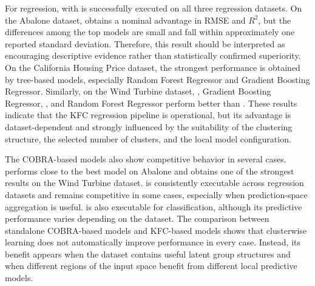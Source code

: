 

For regression,  with  is successfully executed on all three regression datasets. On the Abalone dataset,  obtains a nominal advantage in RMSE and $R^2$, but the differences among the top models are small and fall within approximately one reported standard deviation. Therefore, this result should be interpreted as encouraging descriptive evidence rather than statistically confirmed superiority. On the California Housing Price dataset, the strongest performance is obtained by tree-based models, especially Random Forest Regressor and Gradient Boosting Regressor. Similarly, on the Wind Turbine dataset, , Gradient Boosting Regressor, , and Random Forest Regressor perform better than . These results indicate that the KFC regression pipeline is operational, but its advantage is dataset-dependent and strongly influenced by the suitability of the clustering structure, the selected number of clusters, and the local model configuration.

The COBRA-based models also show competitive behavior in several cases.  performs close to the best model on Abalone and obtains one of the strongest results on the Wind Turbine dataset.  is consistently executable across regression datasets and remains competitive in some cases, especially when prediction-space aggregation is useful.  is also executable for classification, although its predictive performance varies depending on the dataset. The comparison between standalone COBRA-based models and KFC-based models shows that clusterwise learning does not automatically improve performance in every case. Instead, its benefit appears when the dataset contains useful latent group structures and when different regions of the input space benefit from different local predictive models.


